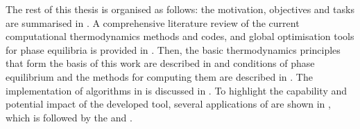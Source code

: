 	The rest of this thesis is organised as follows: the motivation, objectives and tasks are summarised in . A comprehensive literature review of the current computational thermodynamics methods and codes, and global optimisation tools for phase equilibria is provided in .  Then, the basic thermodynamics principles that form the basis of this work are described in  and conditions of phase equilibrium and the methods for computing them are described in . The implementation of algorithms in {\GEM} is discussed in . To highlight the capability and potential impact of the developed tool, several applications of {\GEM} are shown in , which is followed by the  and . 
